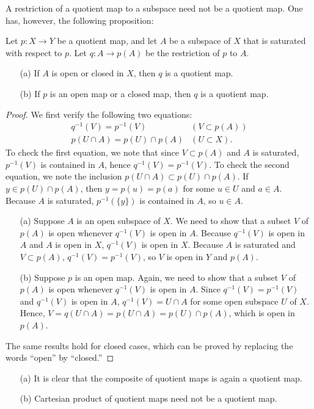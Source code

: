 A restriction of a quotient map to a subspace need not be a quotient map.
One has, however, the following proposition:
\begin{prop}
    Let $p: X\rightarrow Y$ be a quotient map, and let $A$ be a subspace of $X$ that is saturated with respect to $p$.
    Let $q: A\rightarrow p(A)$ be the restriction of $p$ to $A$.
    \begin{enumerate}
        \item[(a)]
        {
            If $A$ is open or closed in $X$, then $q$ is a quotient map.
        }
        \item[(b)]
        {
            If $p$ is an open map or a closed map, then $q$ is a quotient map.
        }
    \end{enumerate}
\end{prop}
\begin{proof}
    We first verify the following two equations:
    \begin{eqnarray*}
        q^{-1}(V)=p^{-1}(V) & (V\subset p(A))\\
        p(U\cap A)=p(U)\cap p(A)    &   (U\subset X).
    \end{eqnarray*}
    To check the first equation, we note that since $V\subset p(A)$ and $A$ is saturated, $p^{-1}(V)$ is contained in $A$, hence $q^{-1}(V)=p^{-1}(V)$.
    To check the second equation, we note the inclusion $p(U\cap A)\subset p(U)\cap p(A)$.
    If $y\in p(U)\cap p(A)$, then $y=p(u)=p(a)$ for some $u\in U$ and $a\in A$.
    Because $A$ is saturated, $p^{-1}(\{y\})$ is contained in $A$, so $u\in A$.
    \begin{enumerate}
        \item[(a)]
        {
            Suppose $A$ is an open subspace of $X$.
            We need to show that a subset $V$ of $p(A)$ is open whenever $q^{-1}(V)$ is open in $A$.
            Because $q^{-1}(V)$ is open in $A$ and $A$ is open in $X$, $q^{-1}(V)$ is open in $X$.
            Because $A$ is saturated and $V\subset p(A)$, $q^{-1}(V)=p^{-1}(V)$, so $V$ is open in $Y$ and $p(A)$.
        }
        \item[(b)]
        {
            Suppose $p$ is an open map.
            Again, we need to show that a subset $V$ of $p(A)$ is open whenever $q^{-1}(V)$ is open in $A$.
            Since $q^{-1}(V)=p^{-1}(V)$ and $q^{-1}(V)$ is open in $A$, $q^{-1}(V)=U\cap A$ for some open subspace $U$ of $X$.
            Hence, $V=q(U\cap A)=p(U\cap A)=p(U)\cap p(A)$, which is open in $p(A)$.
        }
    \end{enumerate}
    The same results hold for closed cases, which can be proved by replacing the words ``open'' by ``closed.''
\end{proof}
\begin{rmk}
    \begin{enumerate}
        \item[(a)]
        {
            It is clear that the composite of quotient maps is again a quotient map.
        }
        \item[(b)]
        {
            Cartesian product of quotient maps need not be a quotient map.
        }
    \end{enumerate}
\end{rmk}

